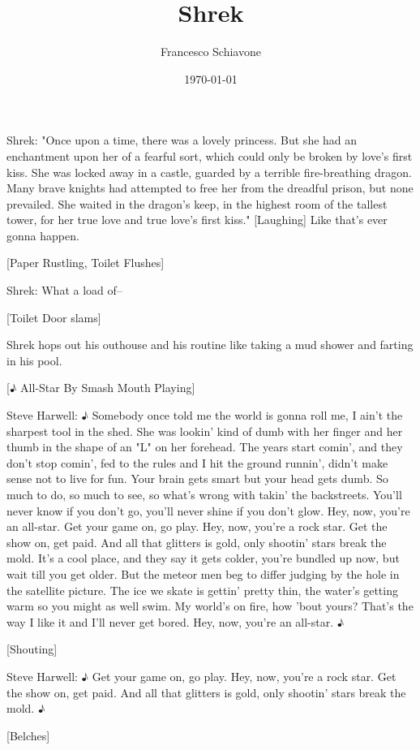 \documentclass{article}
\title{
	\huge\textbf{Shrek}\\
	}
\author{Francesco Schiavone}
\date{\today}
\begin{document}
\maketitle

Shrek:
"Once upon a time, there was a lovely princess. But she had an enchantment upon her of a fearful sort, which could only be broken by love's first kiss. She was locked away in a castle, guarded by a terrible fire-breathing dragon. Many brave knights had attempted to free her from the dreadful prison, but none prevailed. She waited in the dragon's keep, in the highest room of the tallest tower, for her true love and true love's first kiss." [Laughing] Like that's ever gonna happen.

[Paper Rustling, Toilet Flushes]

Shrek:
What a load of--

[Toilet Door slams]

Shrek hops out his outhouse and his routine like taking a mud shower and farting in his pool.

[♪ All-Star By Smash Mouth Playing]

Steve Harwell:
♪ Somebody once told me the world is gonna roll me, I ain't the sharpest tool in the shed. She was lookin' kind of dumb with her finger and her thumb in the shape of an "L" on her forehead. The years start comin', and they don't stop comin', fed to the rules and I hit the ground runnin', didn't make sense not to live for fun. Your brain gets smart but your head gets dumb. So much to do, so much to see, so what's wrong with takin' the backstreets. You'll never know if you don't go, you'll never shine if you don't glow. Hey, now, you're an all-star. Get your game on, go play. Hey, now, you're a rock star. Get the show on, get paid. And all that glitters is gold, only shootin' stars break the mold. It's a cool place, and they say it gets colder, you're bundled up now, but wait till you get older. But the meteor men beg to differ judging by the hole in the satellite picture. The ice we skate is gettin' pretty thin, the water's getting warm so you might as well swim. My world's on fire, how 'bout yours? That's the way I like it and I'll never get bored. Hey, now, you're an all-star. ♪

[Shouting]

Steve Harwell:
♪ Get your game on, go play. Hey, now, you're a rock star. Get the show on, get paid. And all that glitters is gold, only shootin' stars break the mold. ♪

[Belches]
\end{document}
